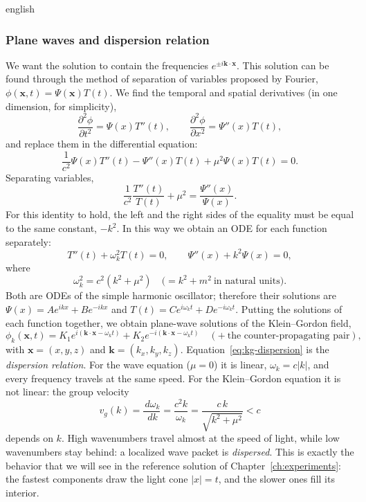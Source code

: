 \documentclass[12pt,letterpaper,twoside]{book}
\newcommand{\abs}[1]{\left\lvert #1 \right\rvert}
\begin{document}
\begin{hyphenrules}{english}
\subsubsection{Plane waves and dispersion relation}
We want the solution to contain the frequencies $e^{\pm i\mathbf{k}\cdot\mathbf{x}}$. This solution can be found
through the method of separation of variables proposed by Fourier, $\phi(\mathbf{x},t)=\Psi(\mathbf{x})T(t)$. We find
the temporal and spatial derivatives (in one dimension, for simplicity),
\begin{equation}
  \frac{\partial^2\phi}{\partial t^2}=\Psi(x)T''(t),\qquad
  \frac{\partial^2\phi}{\partial x^2}=\Psi''(x)T(t),
  \label{eq:kg-sep-1}
\end{equation}
and replace them in the differential equation:
\begin{equation}
  \frac{1}{c^2}\Psi(x)T''(t)-\Psi''(x)T(t)+\mu^2\Psi(x)T(t)=0.
  \label{eq:kg-sep-2}
\end{equation}
Separating variables,
\[
  \frac{1}{c^2}\frac{T''(t)}{T(t)}+\mu^2=\frac{\Psi''(x)}{\Psi(x)}.
\]
For this identity to hold, the left and the right sides of the equality must be equal to the same
constant, $-k^2$. In this way we obtain an ODE for each function separately:
\begin{equation}
  T''(t)+\omega_k^2T(t)=0,\qquad \Psi''(x)+k^2\Psi(x)=0,
  \label{eq:kg-odes}
\end{equation}
where
\begin{equation}
  \omega_k^2=c^2(k^2+\mu^2)\quad\big(=k^2+m^2\ \text{in natural units}\big).
  \label{eq:kg-dispersion}
\end{equation}
Both are ODEs of the simple harmonic oscillator; therefore their solutions are
$\Psi(x)=Ae^{ikx}+Be^{-ikx}$ and $T(t)=Ce^{i\omega_kt}+De^{-i\omega_kt}$. Putting the solutions of each
function together, we obtain plane-wave solutions of the Klein--Gordon field,
\begin{equation}
  \phi_k(\mathbf{x},t)=K_1e^{i(\mathbf{k}\cdot\mathbf{x}-\omega_kt)}+K_2e^{-i(\mathbf{k}\cdot\mathbf{x}-\omega_kt)}
  \quad(+\ \text{the counter-propagating pair}),
  \label{eq:kg-planewave}
\end{equation}
with $\mathbf{x}=(x,y,z)$ and $\mathbf{k}=(k_x,k_y,k_z)$. Equation~\eqref{eq:kg-dispersion} is the \emph{dispersion
relation}. For the wave equation ($\mu=0$) it is linear, $\omega_k=c\abs{k}$, and every frequency
travels at the same speed. For the Klein--Gordon equation it is not linear: the group velocity
\begin{equation}
  v_g(k)=\frac{\,d\omega_k}{\,d k}=\frac{c^2k}{\omega_k}=\frac{c\,k}{\sqrt{k^2+\mu^2}}<c
  \label{eq:kg-group-velocity}
\end{equation}
depends on $k$. High wavenumbers travel almost at the speed of light, while low wavenumbers stay behind:
a localized wave packet is \emph{dispersed}. This is exactly the behavior that we will see in the
reference solution of Chapter~\ref{ch:experiments}: the fastest components draw the light cone $\abs{x}=t$,
and the slower ones fill its interior.


\end{hyphenrules}
\end{document}
